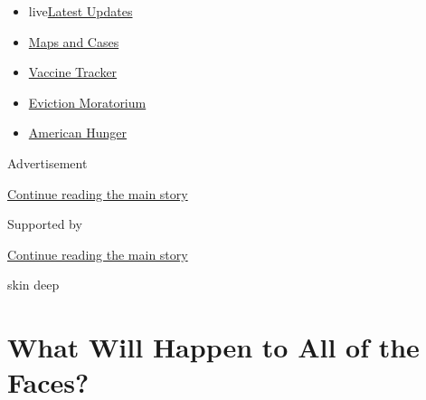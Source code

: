 \begin{itemize}
\tightlist
\item
  live\href{https://www.nytimes3xbfgragh.onion/2020/09/09/world/covid-19-coronavirus.html?name=styln-coronavirus-national\&region=TOP_BANNER\&block=storyline_menu_recirc\&action=click\&pgtype=Article\&impression_id=e0e1ede1-f280-11ea-b468-27530939d74e\&variant=undefined}{Latest
  Updates}
\item
  \href{https://www.nytimes3xbfgragh.onion/interactive/2020/us/coronavirus-us-cases.html?name=styln-coronavirus-national\&region=TOP_BANNER\&block=storyline_menu_recirc\&action=click\&pgtype=Article\&impression_id=e0e1ede2-f280-11ea-b468-27530939d74e\&variant=undefined}{Maps
  and Cases}
\item
  \href{https://www.nytimes3xbfgragh.onion/interactive/2020/science/coronavirus-vaccine-tracker.html?name=styln-coronavirus-national\&region=TOP_BANNER\&block=storyline_menu_recirc\&action=click\&pgtype=Article\&impression_id=e0e1ede3-f280-11ea-b468-27530939d74e\&variant=undefined}{Vaccine
  Tracker}
\item
  \href{https://www.nytimes3xbfgragh.onion/2020/09/02/your-money/eviction-moratorium-covid.html?name=styln-coronavirus-national\&region=TOP_BANNER\&block=storyline_menu_recirc\&action=click\&pgtype=Article\&impression_id=e0e1ede4-f280-11ea-b468-27530939d74e\&variant=undefined}{Eviction
  Moratorium}
\item
  \href{https://www.nytimes3xbfgragh.onion/interactive/2020/09/02/magazine/food-insecurity-hunger-us.html?name=styln-coronavirus-national\&region=TOP_BANNER\&block=storyline_menu_recirc\&action=click\&pgtype=Article\&impression_id=e0e1ede5-f280-11ea-b468-27530939d74e\&variant=undefined}{American
  Hunger}
\end{itemize}

Advertisement

\protect\hyperlink{after-top}{Continue reading the main story}

Supported by

\protect\hyperlink{after-sponsor}{Continue reading the main story}

skin deep

\hypertarget{what-will-happen-to-all-of-the-faces}{%
\section{What Will Happen to All of the
Faces?}\label{what-will-happen-to-all-of-the-faces}}

